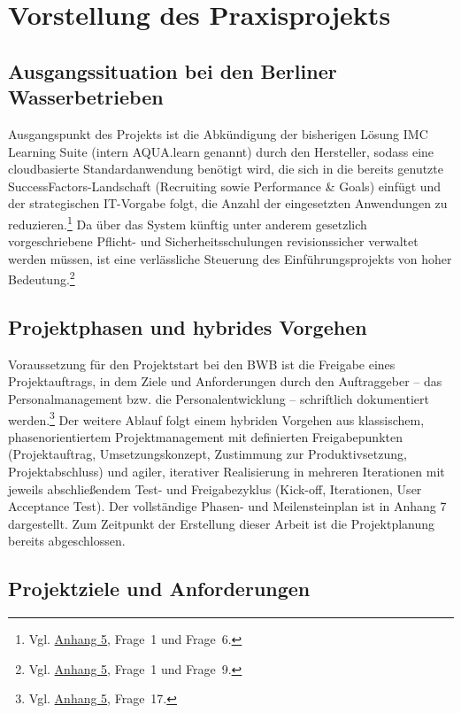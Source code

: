 \documentclass[
    12pt, 
    a4paper,
    ]{scrartcl} %
\begin{document}
\section{Vorstellung des Praxisprojekts}

\subsection{Ausgangssituation bei den Berliner Wasserbetrieben}

Ausgangspunkt des Projekts ist die Abkündigung der bisherigen Lösung IMC Learning Suite (intern AQUA.learn genannt) durch den Hersteller, sodass eine cloudbasierte Standardanwendung benötigt wird, die sich in die bereits genutzte SuccessFactors-Landschaft (Recruiting sowie Performance \& Goals) einfügt und der strategischen IT-Vorgabe folgt, die Anzahl der eingesetzten Anwendungen zu reduzieren.\footnote{Vgl. \hyperref[sec:Anhang5]{Anhang 5}, Frage~1 und Frage~6.} Da über das System künftig unter anderem gesetzlich vorgeschriebene Pflicht- und Sicherheitsschulungen revisionssicher verwaltet werden müssen, ist eine verlässliche Steuerung des Einführungsprojekts von hoher Bedeutung.\footnote{Vgl. \hyperref[sec:Anhang5]{Anhang 5}, Frage~1 und Frage~9.}

\subsection{Projektphasen und hybrides Vorgehen}

Voraussetzung für den Projektstart bei den BWB ist die Freigabe eines Projektauftrags, in dem Ziele und Anforderungen durch den Auftraggeber -- das Personalmanagement bzw. die Personalentwicklung -- schriftlich dokumentiert werden.\footnote{Vgl. \hyperref[sec:Anhang5]{Anhang 5}, Frage~17.}
Der weitere Ablauf folgt einem hybriden Vorgehen aus klassischem, phasenorientiertem Projektmanagement mit definierten Freigabepunkten (Projektauftrag, Umsetzungskonzept, Zustimmung zur Produktivsetzung, Projektabschluss) und agiler, iterativer Realisierung in mehreren Iterationen mit jeweils abschließendem Test- und Freigabezyklus (Kick-off, Iterationen, User Acceptance Test). Der vollständige Phasen- und Meilensteinplan ist in Anhang 7 dargestellt. Zum Zeitpunkt der Erstellung dieser Arbeit ist die Projektplanung bereits abgeschlossen.

\subsection{Projektziele und Anforderungen}
\end{document}
